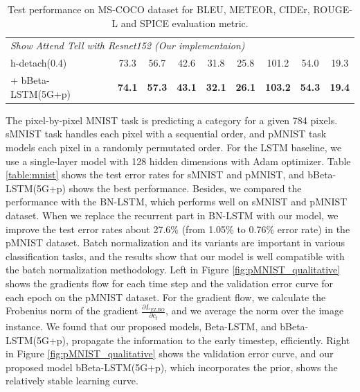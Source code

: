 \documentclass[letterpaper]{article} %
\begin{document}
\begin{table}[h!]
\begin{tabular}{lcccccccc}
		\midrule
		\multicolumn{9}{l}{\emph{Show Attend Tell with Resnet152 (Our implementaion)}} \\
		\hspace{10pt}h-detach(0.4)~\cite{hdetach2019} & 73.3 & 56.7 & 42.6 & 31.8 & 25.8 & 101.2 & 54.0& 19.3\\
		\hspace{10pt}\hspace{1pt} + bBeta-LSTM(5G+p)  & \bfseries 74.1 & \bfseries 57.3 & \bfseries 43.1 & \bfseries 32.1 & \bfseries 26.1 & \bfseries 103.2 & \bfseries 54.3& \bfseries 19.4\\
		\bottomrule
	\end{tabular}
	\centering
	\caption{Test performance on MS-COCO dataset for BLEU, METEOR, CIDEr, ROUGE-L and SPICE evaluation metric.}
	\label{table:coco_results}
\end{table}
The pixel-by-pixel MNIST task is predicting a category for a given 784 pixels. 
sMNIST task handles each pixel with a sequential order, and pMNIST task models each pixel in a randomly permutated order. 
For the LSTM baseline, we use a single-layer model with 128 hidden dimensions with Adam optimizer.
Table \ref{table:mnist} shows the test error rates for sMNIST and pMNIST, and bBeta-LSTM(5G+p) shows the best performance. Besides, we compared the performance with the BN-LSTM, which performs well on sMNIST and pMNIST dataset.
When we replace the recurrent part in BN-LSTM with our model, we improve the test error rates about 27.6\% (from 1.05\% to 0.76\% error rate) in the pMNIST dataset. Batch normalization and its variants are important in various classification tasks, and the results show that our model is well compatible with the batch normalization methodology.
Left in Figure \ref{fig:pMNIST_qualitative} shows the gradients flow for each time step and the validation error curve for each epoch on the pMNIST dataset. For the gradient flow, we calculate the Frobenius norm of the gradient $\frac{\partial L_{ELBO}}{\partial c_{t}}$, and we average the norm over the image instance. We found that our proposed models, Beta-LSTM, and bBeta-LSTM(5G+p), propagate the information to the early timestep, efficiently.  
Right in Figure \ref{fig:pMNIST_qualitative} shows the validation error curve, and our proposed model bBeta-LSTM(5G+p), which incorporates the prior, shows the relatively stable learning curve.
\end{document}
